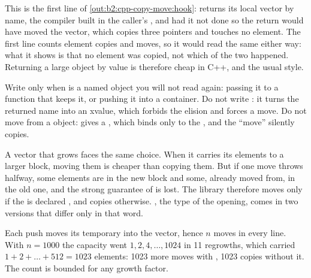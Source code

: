 This is the first line of \cref{out:b2:cpp-copy-move:hook}:  returns its local vector 
by name, the compiler built  in the caller's , and had it not done so the return would have moved the
vector, which copies three pointers and touches no element. The first line counts element copies and moves, so it
would read the same either way: what it shows is that no element was copied, not which of the two happened. Returning a large object by value is therefore cheap in C++, and the usual
style.

\begin{inpractice}
Write  only when  is a named object you will not read again: passing it to a
function that keeps it, or pushing it into a container. Do not write : it turns the
returned name into an xvalue, which forbids the elision and forces a move. Do not move from a  object:
 gives a , which binds only to the , and the ``move'' silently
copies.
\end{inpractice}

A vector that grows faces the same choice. When it carries its elements to a larger block, moving them is cheaper
than copying them. But if one move throws halfway, some elements are in the new block and some, already moved
from, in the old one, and the strong guarantee of  is lost. The library therefore moves only if the
 is declared , and copies otherwise. , the type of the opening, comes
in two versions that differ only in that word.

\label{lst:b2:cpp-copy-move:tracked}

\label{lst:b2:cpp-copy-move:growth}

\label{out:b2:cpp-copy-move:growth}

Each push moves its temporary into the vector, hence $n$ moves in every line. With $n = 1000$ the capacity went
$1, 2, 4, \dots, 1024$ in 11 regrowths, which carried $1 + 2 + \dots + 512 = 1023$ elements: 1023 more moves with
, 1023 copies without it. The count is bounded for any growth factor.

